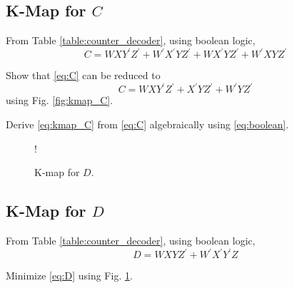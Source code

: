 \documentclass[journal,12pt,twocolumn]{IEEEtran}
\begin{document}
\subsection{K-Map for $C$ }
From Table \ref{table:counter_decoder}, using boolean logic,
\begin{equation}
\label{eq:C}
C = WXY^{\prime}Z^{\prime} + W^{\prime}X^{\prime}YZ^{\prime}
+WX^{\prime}YZ^{\prime}
+W^{\prime}XYZ^{\prime}
\end{equation}
%
\begin{problem}
Show that \eqref{eq:C} can be reduced to
\begin{equation}
\label{eq:kmap_C}
C = WXY^{\prime}Z^{\prime}  +  X^{\prime}YZ^{\prime} + W^{\prime}YZ^{\prime}
\end{equation}
using Fig. \ref{fig:kmap_C}.
\end{problem}
\begin{problem}
Derive \eqref{eq:kmap_C} from \eqref{eq:C} algebraically using \eqref{eq:boolean}.
\end{problem}
%
\begin{figure}[!h]
\resizebox {\columnwidth} {!} {

}
\caption{K-map for $D$.}
\label{fig:kmap_D}
\end{figure}

\subsection{K-Map for $D$ }
From Table \ref{table:counter_decoder}, using boolean logic,
\begin{equation}
\label{eq:D}
D = WXYZ^{\prime} + W^{\prime}X^{\prime}Y^{\prime}Z
\end{equation}
%
\begin{problem}
Minimize \eqref{eq:D} using Fig. \ref{fig:kmap_D}.
\end{problem}
\end{document}
